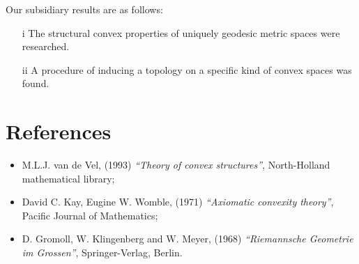 \documentclass[conference]{IEEEtran}
\begin{document}
Our subsidiary results are as follows:

\begin{enumerate}
    \item[i] The structural convex properties of uniquely geodesic metric spaces were researched.
    \item[ii] A procedure of inducing a topology on a specific kind of convex spaces was found. 
\end{enumerate}



\section*{\Large{ References }}

\begin{itemize}
    \item M.L.J. van de Vel, (1993) \textit{``Theory of convex structures''}, North-Holland mathematical library;
    \item David C. Kay, Eugine W. Womble, (1971) \textit{``Axiomatic convexity theory''}, Pacific Journal of Mathematics;
    \item D. Gromoll, W. Klingenberg and W. Meyer, (1968) \textit{``Riemannsche Geometrie im Grossen''}, Springer-Verlag, Berlin. 
\end{itemize}
\end{document}
